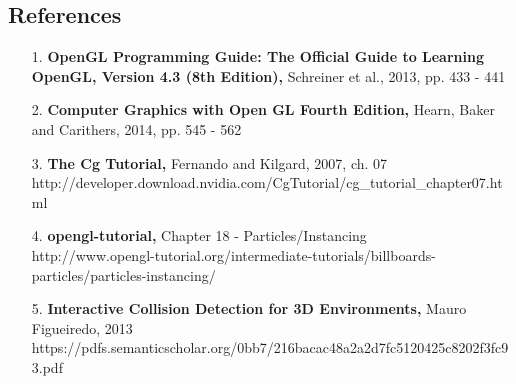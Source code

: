 \documentclass {article}
\begin{document}
\subsection{References}
	\begin{itemize}
  	
  		\item[1. ] {\bf OpenGL Programming Guide: The Official Guide to Learning OpenGL, Version 4.3 (8th Edition),} Schreiner et al., 2013, pp. 433 - 441 
  		\item[2. ] {\bf Computer Graphics with Open GL Fourth Edition,} Hearn, Baker and Carithers, 2014, pp. 545 - 562
  		\item[3. ]  {\bf The Cg Tutorial,} Fernando and Kilgard, 2007, ch. 07\\http://developer.download.nvidia.com/CgTutorial/cg\_tutorial\_chapter07.html
  		\item[4. ]  {\bf opengl-tutorial, } Chapter 18 - Particles/Instancing\\
     http://www.opengl-tutorial.org/intermediate-tutorials/billboards-particles/particles-instancing/
     
     	\item[5. ] {\bf Interactive Collision Detection for 3D Environments, } Mauro Figueiredo, 2013\\
     	https://pdfs.semanticscholar.org/0bb7/216bacac48a2a2d7fc5120425c8202f3fc93.pdf
     
	
	\end{itemize}

     
\end{document}
